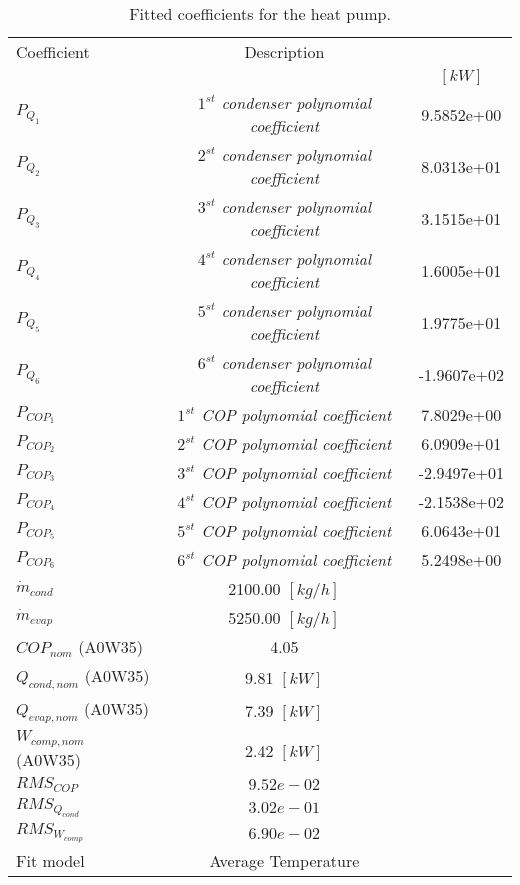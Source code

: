 \documentclass[english]{SPFShortReport}
\author{Dani Carbonell}
\begin{document}
\begin{table}[!ht]
\begin{small}
\caption{Fitted coefficients for the heat pump.}
\begin{center}
\resizebox{12cm}{!} 
{
\begin{tabular}{l | c c } 
\hline
\hline
Coefficient &Description & \\ 
 & &$[kW]$\\ 
\hline
$P_{Q_{1}}$ & \emph{$1^{st}$ condenser polynomial coefficient}  & 9.5852e+00    \\ 
$P_{Q_{2}}$ & \emph{$2^{st}$ condenser polynomial coefficient}  & 8.0313e+01    \\ 
$P_{Q_{3}}$ & \emph{$3^{st}$ condenser polynomial coefficient}  & 3.1515e+01    \\ 
$P_{Q_{4}}$ & \emph{$4^{st}$ condenser polynomial coefficient}  & 1.6005e+01    \\ 
$P_{Q_{5}}$ & \emph{$5^{st}$ condenser polynomial coefficient}  & 1.9775e+01    \\ 
$P_{Q_{6}}$ & \emph{$6^{st}$ condenser polynomial coefficient}  & -1.9607e+02    \\ 
\hline
$P_{COP_{1}}$ & \emph{$1^{st}$ COP polynomial coefficient}  & 7.8029e+00    \\ 
$P_{COP_{2}}$ & \emph{$2^{st}$ COP polynomial coefficient}  & 6.0909e+01    \\ 
$P_{COP_{3}}$ & \emph{$3^{st}$ COP polynomial coefficient}  & -2.9497e+01    \\ 
$P_{COP_{4}}$ & \emph{$4^{st}$ COP polynomial coefficient}  & -2.1538e+02    \\ 
$P_{COP_{5}}$ & \emph{$5^{st}$ COP polynomial coefficient}  & 6.0643e+01    \\ 
$P_{COP_{6}}$ & \emph{$6^{st}$ COP polynomial coefficient}  & 5.2498e+00    \\ 
\hline
$\dot m_{cond}$ & 2100.00 $[kg/h]$ \\ 
$\dot m_{evap}$ & 5250.00 $[kg/h]$ \\ 
\hline
$COP_{nom}$ (A0W35)& 4.05 \\ 
$Q_{cond,nom}$ (A0W35)& 9.81 $[kW]$\\ 
$Q_{evap,nom}$ (A0W35)& 7.39 $[kW]$\\ 
$W_{comp,nom}$ (A0W35)& 2.42 $[kW]$\\ 
\hline
 $RMS_{COP}$ & $9.52e-02$ \\ 
 $RMS_{Q_{cond}}$ & $3.02e-01$ \\ 
 $RMS_{W_{comp}}$ & $6.90e-02$ \\ 
\hline
Fit model & Average Temperature\\ 
\hline
\hline
\end{tabular}
}
\label{CoefTable}
\end{center}
\end{small}
\end{table}
\end{document}
